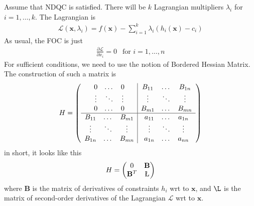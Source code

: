 \documentclass[10pt,a4paper]{book}
\theoremstyle{definition}\newtheorem{definition}{Definition}
\theoremstyle{definition}\newtheorem{fact}{Fact}
\theoremstyle{definition}\newtheorem{ex}{Ex.}
\theoremstyle{definition}\newtheorem{project}{Project}
\theoremstyle{definition}\newtheorem{problem}{Problem}
\theoremstyle{definition}\newtheorem{example}{Example}
\numberwithin{theorem}{chapter}
\numberwithin{corollary}{chapter}
\numberwithin{assumption}{chapter}
\numberwithin{definition}{chapter}
\numberwithin{prop}{chapter}
\numberwithin{notation}{chapter}
\numberwithin{problem}{chapter}
\numberwithin{example}{chapter}
\numberwithin{fact}{chapter}
\numberwithin{ex}{chapter}
\def\B{\mathbf B}
\def\x{\mathbf x}
\begin{document}
	Assume that NDQC is satisfied. There will be $k$ Lagrangian multipliers $\lambda_i$ for  $i = 1, \dots, k$. The Lagrangian is
	\begin{align*}
		\mathcal{L} (\x, \lambda_i) = f(\x) - \sum^k_{i=1} \lambda_i (h_i(\x) - c_i) 
	\end{align*}
	As usual, the FOC is just
	\begin{align*}
		\frac{\partial \mathcal{L}}{\partial x_i} = 0  \ \ \text{ for $i=1,\dots,n$}
	\end{align*}
	For sufficient conditions, we need to use the notion of Bordered Hessian Matrix. The construction of such a matrix is
	\begin{equation*}
		H = \left( \begin{array}{c | c}
			\begin{matrix}
				0      & \dots  & 0      \\
				\vdots & \ddots & \vdots \\
				0      & \dots  & 0      
			\end{matrix} & 
			\begin{matrix}
				B_{11} & \dots  & B_{1n} \\
				\vdots & \ddots & \vdots \\
				B_{m1} & \dots  & B_{mn} 
			\end{matrix} \\
			\hline
			\begin{matrix}
				B_{11} & \dots  & B_{m1} \\
				\vdots & \ddots & \vdots \\
				B_{1n} & \dots  & B_{mn} 
			\end{matrix} & 
			\begin{matrix}
				a_{11} & \dots  & a_{1n} \\
				\vdots & \ddots & \vdots \\
				a_{1n} & \dots  & a_{nn} 
			\end{matrix}
		\end{array} \right)
	\end{equation*}
	in short, it looks like this
	\begin{align*}
		H = \begin{pmatrix}
			0 & \B \\ \B^T & \L
		\end{pmatrix}
	\end{align*}
	where $\B$ is the matrix of derivatives of constraints $h_i$ wrt to $\x$, and $\L$ is the matrix of second-order derivatives of the Lagrangian $\mathcal{L}$ wrt to $\x$. 
	
\end{document}
